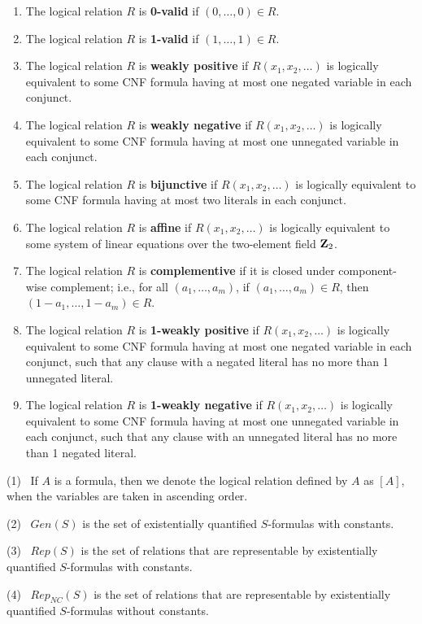 \begin{definition}\label{def:affine}

\begin{enumerate}
\item
The logical relation $R$ is {\bf 0-valid} if $(0, \ldots, 0) \in R$.
\item
The logical relation $R$ is {\bf 1-valid} if $(1, \ldots, 1) \in R$.
\item
The logical relation $R$ is {\bf weakly positive} if
$R(x_1,x_2,\ldots)$ is logically equivalent to some CNF formula having at
most one negated variable in each conjunct.
\item
The logical relation $R$ is {\bf weakly negative} if
$R(x_1,x_2,\ldots)$ is logically equivalent to some CNF formula having at
most one unnegated variable in each conjunct.
\item
The logical relation $R$ is {\bf bijunctive} if
$R(x_1,x_2,\ldots)$ is logically equivalent to some CNF formula having at
most two literals in each conjunct.
\item
The logical relation $R$ is {\bf affine} if $R(x_1,x_2,\ldots)$ is logically 
equivalent to some system of linear equations over the two-element field 
${\bf Z}_2$.
\item
The logical relation $R$ is {\bf complementive} 
if it is closed under component-wise
complement; i.e., for all $(a_1,\ldots,a_m)$, if $(a_1,\ldots,a_m) \in R$, 
then $(1-a_1,\ldots,1-a_m) \in R$.
\item
The logical relation $R$ is {\bf 1-weakly positive} if
$R(x_1,x_2,\ldots)$ is logically equivalent to some CNF formula having at
most one negated variable in each conjunct, such that any clause with
a negated literal has no more than 1 unnegated literal.
\item
The logical relation $R$ is {\bf 1-weakly negative} if
$R(x_1,x_2,\ldots)$ is logically equivalent to some CNF formula having at
most one unnegated variable in each conjunct, such that any clause with
an unnegated literal has no more than 1 negated literal.
\end{enumerate}
\end{definition}



\begin{definition}\label{def:rep}
(1)~ If $A$ is a formula, then we denote the 
logical relation defined by $A$ as {\bf $[A]$},
when the variables are taken in ascending order.

\noindent
(2)~ {\sf $Gen(S)$} is the set of existentially quantified $S$-formulas with
constants.

\noindent
(3)~ {\sf $Rep(S)$} is the set of relations that are representable by existentially 
quantified $S$-formulas with constants.

\noindent
(4)~ {\sf $Rep_{NC}(S)$} is the set of relations that are 
representable by existentially quantified $S$-formulas without constants.
\end{definition}




